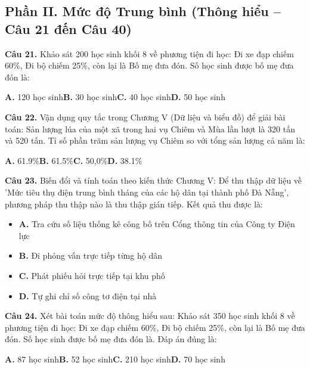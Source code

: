 \documentclass[11pt,a4paper]{article}
\begin{document}
\subsection*{\color{accent} Phần II. Mức độ Trung bình (Thông hiểu -- Câu 21 đến Câu 40)}
\textbf{\color{primary} Câu 21.} Khảo sát 200 học sinh khối 8 về phương tiện đi học: Đi xe đạp chiếm 60\%, Đi bộ chiếm 25\%, còn lại là Bố mẹ đưa đón. Số học sinh được bố mẹ đưa đón là:\par
\hspace*{1.5em}\textbf{A.} 120 học sinh\quad\quad \textbf{B.} 30 học sinh\quad\quad \textbf{C.} 40 học sinh\quad\quad \textbf{D.} 50 học sinh\par\vspace{2pt}
\textbf{\color{primary} Câu 22.} Vận dụng quy tắc trong Chương V (Dữ liệu và biểu đồ) để giải bài toán: Sản lượng lúa của một xã trong hai vụ Chiêm và Mùa lần lượt là 320 tấn và 520 tấn. Tỉ số phần trăm sản lượng vụ Chiêm so với tổng sản lượng cả năm là:\par
\hspace*{1.5em}\textbf{A.} 61.9\%\quad\quad \textbf{B.} 61.5\%\quad\quad \textbf{C.} 50,0\%\quad\quad \textbf{D.} 38.1\%\par\vspace{2pt}
\textbf{\color{primary} Câu 23.} Biến đổi và tính toán theo kiến thức Chương V: Để thu thập dữ liệu về 'Mức tiêu thụ điện trung bình tháng của các hộ dân tại thành phố Đà Nẵng', phương pháp thu thập nào là thu thập gián tiếp. Kết quả thu được là:\par
\begin{itemize}\setlength{\itemsep}{1pt}\setlength{\parskip}{0pt}
  \item[] \textbf{A.} Tra cứu số liệu thống kê công bố trên Cổng thông tin của Công ty Điện lực
  \item[] \textbf{B.} Đi phỏng vấn trực tiếp từng hộ dân
  \item[] \textbf{C.} Phát phiếu hỏi trực tiếp tại khu phố
  \item[] \textbf{D.} Tự ghi chỉ số công tơ điện tại nhà
\end{itemize}\vspace{2pt}
\textbf{\color{primary} Câu 24.} Xét bài toán mức độ thông hiểu sau: Khảo sát 350 học sinh khối 8 về phương tiện đi học: Đi xe đạp chiếm 60\%, Đi bộ chiếm 25\%, còn lại là Bố mẹ đưa đón. Số học sinh được bố mẹ đưa đón là. Đáp án đúng là:\par
\hspace*{1.5em}\textbf{A.} 87 học sinh\quad\quad \textbf{B.} 52 học sinh\quad\quad \textbf{C.} 210 học sinh\quad\quad \textbf{D.} 70 học sinh\par\vspace{2pt}
\end{document}
